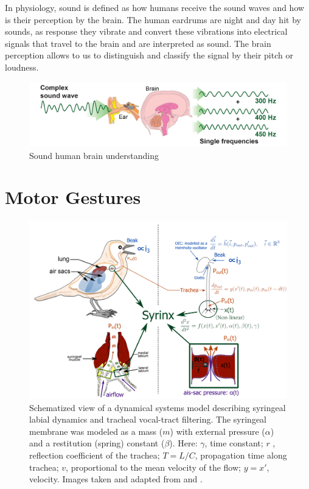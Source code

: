 In physiology, sound is defined as how humans receive the  sound waves and how is their perception by the brain. The human eardrums are night and day hit by sounds, as response they vibrate and convert these vibrations into electrical signals that travel to the brain and are interpreted as sound. The brain perception allows to us to distinguish and classify the signal by their pitch or loudness.

\begin{figure}[H]
    \centering
    \includegraphics[width=0.9\linewidth]{Images/complex_sound.png}
    \caption{Sound human brain understanding \cite{sound_pasco} }
    \label{fig:}
\end{figure}





\section{Motor Gestures}


\begin{figure}[H]
    \centering
    \includegraphics[width=0.85\linewidth]{Images/model.png}
    \caption{Schematized view of a dynamical systems model describing syringeal labial dynamics and tracheal vocal-tract filtering. The syringeal membrane was modeled as a mass ($m$) with external pressure ($\alpha$) and a restitution (spring) constant ($\beta$). Here: $\gamma$, time constant; $r$ , reflection coefficient of the trachea; $T=L/C$, propagation time along trachea; $v$, proportional to the mean velocity of the flow; $y=x'$, velocity. Images taken and adapted from \cite{complete_model} and \cite{siryx_image}.}
    \label{fig:bird_sound_organs}
\end{figure}


